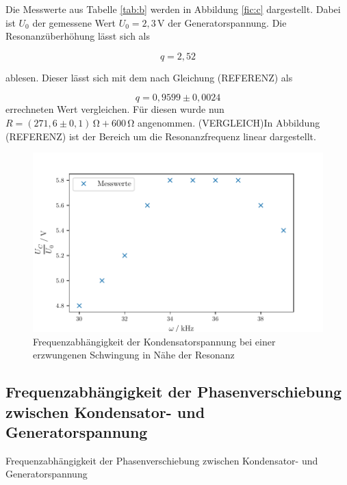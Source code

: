 \noindent Die Messwerte aus Tabelle \ref{tab:b} werden
in Abbildung \ref{fic:c} dargestellt. Dabei ist $U_0$ 
der gemessene Wert $U_0=2,3\,\si{\volt} $ der Generatorspannung. Die Resonanzüberhöhung
lässt sich als

\begin{equation*}
  q=2,52
\end{equation*}

\noindent ablesen. Dieser lässt sich mit dem nach Gleichung
(REFERENZ) als 

\begin{equation*}
  q=0,9599\pm0,0024
\end{equation*}
\noindent errechneten Wert vergleichen. Für diesen wurde
nun $R=(271,6\pm0,1)\,\si{\ohm} + 600\,\si{\ohm}$ angenommen. (VERGLEICH)In Abbildung (REFERENZ) ist der Bereich
um die Resonanzfrequenz linear dargestellt.
\begin{figure}[H]
  \centering
  \includegraphics{build/plot3.pdf}
  \caption{Frequenzabhängigkeit der Kondensatorspannung bei einer erzwungenen Schwingung in Nähe der Resonanz}
  \label{fig:plot}
\end{figure}



\subsection{Frequenzabhängigkeit der Phasenverschiebung zwischen Kondensator- und Generatorspannung}

\begin{table}[H]
  \centering
  
  
  \caption{Frequenzabhängigkeit der Phasenverschiebung zwischen Kondensator- und Generatorspannung}
  \label{tab:a}
\end{table}

